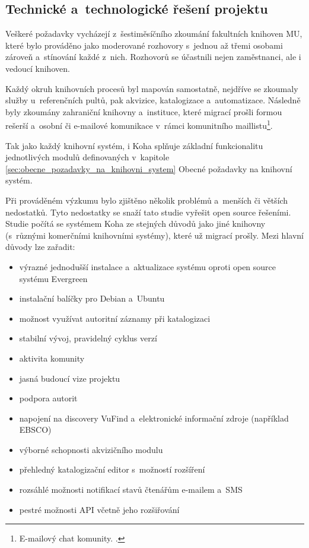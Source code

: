\documentclass[
	11pt, oneside, printed, final, palatino, monochrome
	microtype,
	table,   %
	lof,     %
	lot     %
]{fithesis3}
\begin{document}
{\subsection{Technické a~technologické řešení projektu}

Veškeré požadavky vycházejí z~šestiměsíčního zkoumání fakultních knihoven MU, které bylo prováděno jako moderované rozhovory s~jednou až třemi osobami zároveň a~stínování každé z~nich. Rozhovorů se účastnili nejen zaměstnanci, ale i vedoucí knihoven. 

Každý okruh knihovních procesů byl mapován samostatně, nejdříve se zkoumaly služby u~referenčních pultů, pak akvizice, katalogizace a~automatizace. Následně byly zkoumány zahraniční knihovny a~instituce, které migrací prošli formou rešerší a~osobní či e-mailové komunikace v~rámci komunitního maillistu\footnote{E-mailový chat komunity.
.}. 

Tak jako každý knihovní systém, i Koha splňuje základní funkcionalitu jednotlivých modulů definovaných v~kapitole \ref{sec:obecne_pozadavky_na_knihovni_system} Obecné požadavky na knihovní systém.

Při prováděném výzkumu bylo zjištěno několik problémů a~menších či větších nedostatků. Tyto nedostatky se snaží tato studie vyřešit open source řešeními. Studie počítá se systémem Koha ze stejných důvodů jako jiné knihovny (s~různými komerčními knihovními systémy), které už migrací prošly. Mezi hlavní důvody lze zařadit: 

\begin{itemize}
\item výrazné jednodušší instalace a~aktualizace systému oproti open source systému Evergreen
\item instalační balíčky pro Debian a~Ubuntu
\item možnost využívat autoritní záznamy při katalogizaci
\item stabilní vývoj, pravidelný cyklus verzí
\item aktivita komunity
\item jasná budoucí vize projektu
\item podpora autorit
\item napojení na discovery VuFind a~elektronické informační zdroje (například EBSCO)
\item výborné schopnosti akvizičního modulu
\item přehledný katalogizační editor s~možností rozšíření
\item rozsáhlé možnosti notifikací stavů čtenářům e-mailem a~SMS
\item pestré možnosti API včetně jeho rozšiřování
\end{itemize}

}
\end{document}
